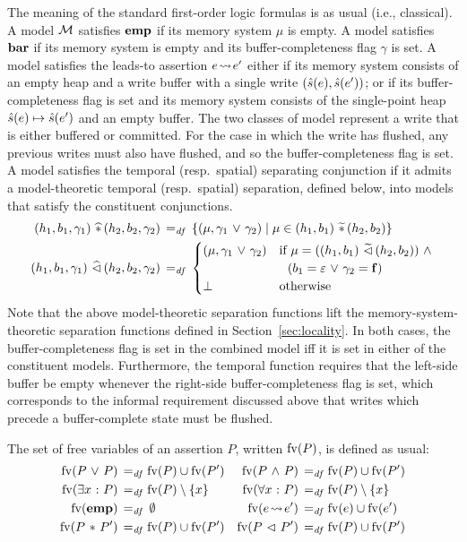 \documentclass[11pt]{report}
\begin{document}
The meaning of the standard first-order logic formulas is as usual (i.e., classical). A model $\mathcal{M}$ satisfies $\mathbf{emp}$ if its memory system $\mu$ is empty. A model satisfies $\mathbf{bar}$ if its memory system is empty and its buffer-completeness flag $\gamma$ is set. A model satisfies the leads-to assertion $e \!\leadsto\! e'$ either if its memory system consists of an empty heap and a write buffer with a single write $(\hat{s}(e), \hat{s}(e'))$; or if its buffer-completeness flag is set and its memory system consists of the single-point heap $\hat{s}(e) \mapsto \hat{s}(e')$ and an empty buffer. The  two classes of model represent a write that is either buffered or committed. For the case in which the write has flushed, any previous writes must also have flushed, and so the buffer-completeness flag is set. A model satisfies the temporal (resp.\ spatial) separating conjunction if it admits a model-theoretic temporal (resp.\ spatial) separation, defined below, into models that satisfy the constituent conjunctions. 
\begin{align*}
  (h_1,b_1,\gamma_1) \operatorname{\,\widehat{\ast}\,} (h_2,b_2,\gamma_2) \operatorname{\;=_{\mathit{df}}\;} & \left\lbrace (\mu,\gamma_1 \operatorname{\,\vee\,} \gamma_2) \mid \mu \in (h_1,b_1) \operatorname{\,\widetilde{\ast}\,} (h_2,b_2) \right\rbrace \\ 
  (h_1,b_1,\gamma_1) \operatorname{\,\widehat{\vartriangleleft}\,} (h_2,b_2,\gamma_2) \operatorname{\;=_{\mathit{df}}\;} & \begin{cases}
  (\mu,\gamma_1 \operatorname{\,\vee\,} \gamma_2) & \text{if $\mu = ((h_1,b_1) \operatorname{\,\widetilde{\vartriangleleft}\,} (h_2,b_2)) \operatorname{\,\wedge\,}$} \\ 
  &  \text{~~$(b_1 = \varepsilon \operatorname{\,\vee\,} \gamma_2 = \mathbf{f})$} \\ 
  \bot & \text{otherwise}
  \end{cases}
\end{align*}
Note that the above model-theoretic separation functions lift the memory-system-theoretic separation functions defined in Section~\ref{sec:locality}. In both cases, the buffer-completeness flag is set in the combined model iff it is set in either of the constituent models. Furthermore, the temporal function requires that the left-side buffer be empty whenever the right-side buffer-completeness flag is set, which corresponds to the informal requirement discussed above that writes which precede a buffer-complete state must be flushed. 


The set of free variables of an assertion $P$, written $\mathrm{fv}(P)$, is defined as usual: \begin{align*}
    \mathrm{fv}(P \operatorname{\,\vee\,} P) \operatorname{\;=_{\mathit{df}}\;} & \mathrm{fv}(P) \cup \mathrm{fv}(P') & \mathrm{fv}(P \operatorname{\,\wedge\,} P) \operatorname{\;=_{\mathit{df}}\;} & \mathrm{fv}(P) \cup \mathrm{fv}(P') \\ 
    \mathrm{fv}(\exists x \operatorname{\,:\,} P) \operatorname{\;=_{\mathit{df}}\;} &\mathrm{fv}(P) \setminus \left\lbrace x \right\rbrace & \mathrm{fv}(\forall x \operatorname{\,:\,} P) \operatorname{\;=_{\mathit{df}}\;} &\mathrm{fv}(P) \setminus \left\lbrace x \right\rbrace \\
    \mathrm{fv}(\mathbf{emp}) \operatorname{\;=_{\mathit{df}}\;} & \operatorname{\emptyset} &  \mathrm{fv}(e \!\leadsto\! e') \operatorname{\;=_{\mathit{df}}\;} & \mathrm{fv}(e) \cup \mathrm{fv}(e') \\
    \mathrm{fv}(P \operatorname{\,\ast\,} P') \operatorname{\;=_{\mathit{df}}\;} & \mathrm{fv}(P) \cup \mathrm{fv}(P') & 
    \mathrm{fv}(P \operatorname{\,\vartriangleleft\,} P') \operatorname{\;=_{\mathit{df}}\;} & \mathrm{fv}(P) \cup \mathrm{fv}(P') 
\end{align*}
\end{document}
